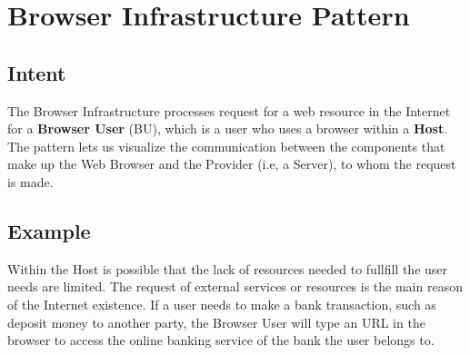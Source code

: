 \documentclass{sig-alternate-05-2015}
\begin{document}



\section*{Browser Infrastructure Pattern}

  \subsection*{Intent}
  The Browser Infrastructure processes request for a web resource in the Internet for a \textbf{Browser User} (BU), which is a user who uses a browser within a \textbf{Host}. The pattern lets us visualize the communication between the components that make up the Web Browser and the Provider (i.e, a Server), to whom the request is made.

  \subsection*{Example}
  Within the Host is possible that the lack of resources needed to fullfill the user needs are limited. The request of external services or resources is the main reason of the Internet existence. If a user needs to make a bank transaction, such as deposit money to another party, the Browser User will type an URL in the browser to access the online banking service of the bank the user belongs to.
  
\end{document}
